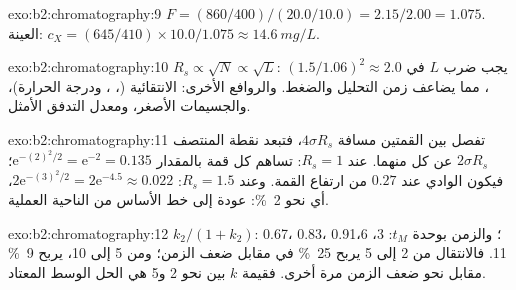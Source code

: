 \begin{solution}{exo:b2:chromatography:9}
$F = (860/400)/(20.0/10.0) = 2.15/2.00 = 1.075$. العينة: $c_X = (645/410) \times 10.0/1.075 \approx
\qty{14.6}{mg/L}$.
\end{solution}

\begin{solution}{exo:b2:chromatography:10}
$R_s \propto \sqrt N \propto \sqrt L$: يجب ضرب $L$ في $(1.5/1.06)^2 \approx 2.0$، مما يضاعف
زمن التحليل والضغط. والروافع الأخرى: الانتقائية (، ، ودرجة
الحرارة)، والجسيمات الأصغر، ومعدل التدفق الأمثل.
\end{solution}

\begin{solution}{exo:b2:chromatography:11}
تفصل بين القمتين مسافة $4\sigma R_s$، فتبعد نقطة المنتصف $2\sigma R_s$ عن كل منهما. عند $R_s = 1$: تساهم كل قمة
بالمقدار $\mathrm e^{-(2)^2/2} = \mathrm e^{-2} = 0.135$؛ فيكون الوادي عند $0.27$ من ارتفاع القمة.
وعند $R_s = 1.5$: $2\mathrm e^{-(3)^2/2} = 2\mathrm e^{-4.5} \approx 0.022$، أي نحو 2~\%: عودة إلى خط الأساس
من الناحية العملية.
\end{solution}

\begin{solution}{exo:b2:chromatography:12}
$k_2/(1+k_2)$: 0.67، 0.83، 0.91؛ والزمن بوحدة $t_M$: 3، 6، 11. فالانتقال من 2 إلى 5 يربح 25~\% في
 مقابل ضعف الزمن؛ ومن 5 إلى 10، يربح 9~\% مقابل نحو ضعف الزمن مرة أخرى. فقيمة $k$ بين نحو 2 و5 هي
الحل الوسط المعتاد.
\end{solution}


